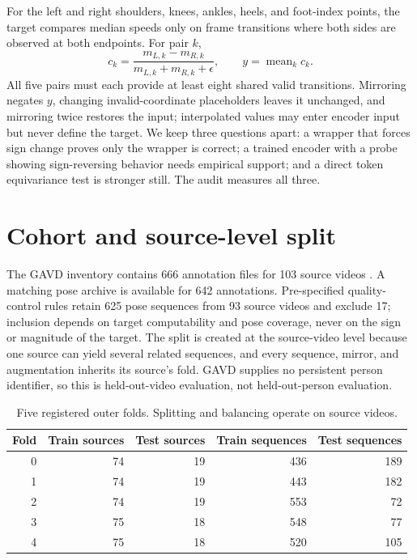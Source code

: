 \documentclass{article}
\begin{document}
For the left and right shoulders, knees, ankles, heels, and foot-index points, the target compares median speeds only on frame transitions where both sides are observed at both endpoints. For pair $k$,
\[
c_k=\frac{m_{L,k}-m_{R,k}}{m_{L,k}+m_{R,k}+\epsilon},
\qquad y=\operatorname{mean}_k c_k.
\]
All five pairs must each provide at least eight shared valid transitions. Mirroring negates $y$, changing invalid-coordinate placeholders leaves it unchanged, and mirroring twice restores the input; interpolated values may enter encoder input but never define the target. We keep three questions apart: a wrapper that forces sign change proves only the wrapper is correct; a trained encoder with a probe showing sign-reversing behavior needs empirical support; and a direct token equivariance test is stronger still. The audit measures all three.

\section{Cohort and source-level split}

The GAVD inventory contains 666 annotation files for 103 source videos \citep{ranjan2025gavd,gavdRepo2026}. A matching pose archive is available for 642 annotations. Pre-specified quality-control rules retain 625 pose sequences from 93 source videos and exclude 17; inclusion depends on target computability and pose coverage, never on the sign or magnitude of the target. The split is created at the source-video level because one source can yield several related sequences, and every sequence, mirror, and augmentation inherits its source's fold. GAVD supplies no persistent person identifier, so this is held-out-video evaluation, not held-out-person evaluation.

\begin{table}[h]
  \centering
  \caption{Five registered outer folds. Splitting and balancing operate on source videos.}
  \label{tab:splits}
  \begin{tabular}{rrrrr}
    \toprule
    Fold & Train sources & Test sources & Train sequences & Test sequences \\
    \midrule
    0 & 74 & 19 & 436 & 189 \\
    1 & 74 & 19 & 443 & 182 \\
    2 & 74 & 19 & 553 & 72 \\
    3 & 75 & 18 & 548 & 77 \\
    4 & 75 & 18 & 520 & 105 \\
    \bottomrule
  \end{tabular}
\end{table}
\end{document}
